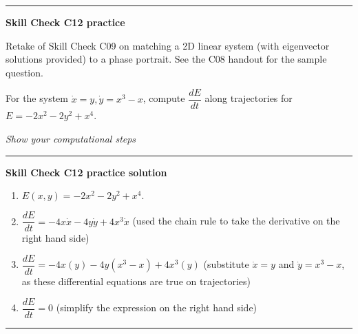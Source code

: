 \documentclass[12pt,letterpaper,noanswers]{exam}
\begin{document}
\vspace{0.2cm}
\hrule
\vspace{0.2cm}

\noindent\textbf{Skill Check C12 practice}
\begin{questions}

\item Retake of Skill Check C09 on matching a 2D linear system (with eigenvector solutions provided) to a phase portrait.  See the C08 handout for the sample question.

\item For the system $\dot x = y, \dot y = x^3-x$, compute $\dfrac{dE}{dt}$ along trajectories for $E =-2 x^2 - 2y^2 + x^4$.

\emph{Show your computational steps}
\end{questions}

\vspace{0.2cm}

\hrule
\vspace{0.2cm}

\noindent\textbf{Skill Check C12 practice solution}
\begin{enumerate}
\item $E(x,y) = -2x^2 - 2y^2 + x^4.$
\item $\dfrac{dE}{dt} = -4x \dot{x} - 4y\dot{y} + 4x^3\dot x$ (used the chain rule to take the derivative on the right hand side)
\item $\dfrac{dE}{dt} = -4x(y) - 4y(x^3-x) + 4x^3(y)$ (substitute $\dot x = y$ and $\dot y = x^3-x$, as these differential equations are true on trajectories)
\item $\dfrac{dE}{dt} = 0$ (simplify the expression on the right hand side)
\end{enumerate}


\vspace{0.2cm}
\hrule
\vspace{0.2cm}
\end{document}
